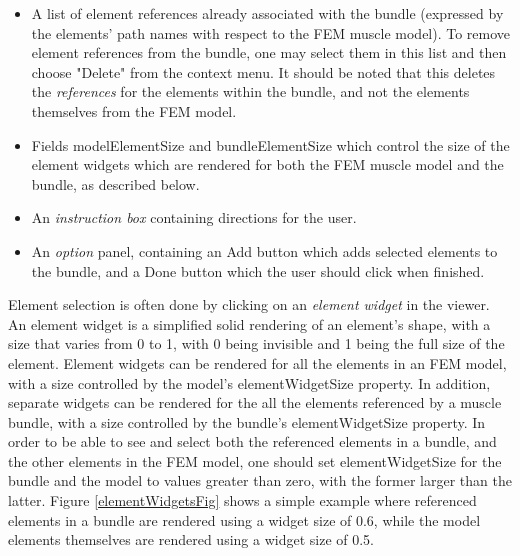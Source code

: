 \documentclass{article}
\begin{document}
\begin{itemize}

\item A list of element references already associated
with the bundle (expressed by the elements' path names with respect to
the FEM muscle model).  To remove element references from the bundle, one may
select them in this list and then choose {\sf "Delete"} from the
context menu. It should be noted that this deletes the {\it references}
for the elements within the bundle, and not the elements themselves
from the FEM model.

\item Fields {\sf modelElementSize} and {\sf bundleElementSize} which control the
size of the element widgets which are rendered for both the FEM muscle
model and the bundle, as described below.

\item An {\it instruction box} containing directions for the user.

\item An {\it option} panel, containing an {\sf Add} button which adds selected
elements to the bundle, and a {\sf Done} button which the user should
click when finished.

\end{itemize}

Element selection is often done by clicking on an {\it element widget} in
the viewer. An element widget is a simplified solid rendering of an
element's shape, with a size that varies from 0 to 1, with 0 being
invisible and 1 being the full size of the element.  Element widgets
can be rendered for all the elements in an FEM model, with a size
controlled by the model's {\sf elementWidgetSize} property. In addition,
separate widgets can be rendered for the all the elements referenced
by a muscle bundle, with a size controlled by the bundle's
{\sf elementWidgetSize} property. In order to be able to see and select
both the referenced elements in a bundle, and the other
elements in the FEM model, one should set {\sf elementWidgetSize} for the
bundle and the model to values greater than zero, with the former
larger than the latter. Figure \ref{elementWidgetsFig} shows a simple example
where referenced elements in a bundle are rendered using a widget size of
0.6, while the model elements themselves are rendered using
a widget size of 0.5.
\end{document}

